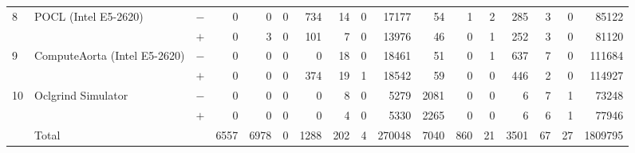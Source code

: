 \begin{tabular}{lll | rrrrrrr | rrrrrrr }
\hline
\multirow{ 2}{*}{8} & \multirow{ 2}{*}{POCL (Intel E5-2620)} & $-$ & 0 & 0 & 0 & 734 & 14 & 0 & 17177       & 54 & 1 & 2 & 285 & 3 & 0 & 85122 \\& & $+$ & 0 & 3 & 0 & 101 & 7 & 0 & 13976 & 46 & 0 & 1 & 252 & 3 & 0 & 81120 \\
\hline
\multirow{ 2}{*}{9} & \multirow{ 2}{*}{ComputeAorta (Intel E5-2620)} & $-$ & 0 & 0 & 0 & 0 & 18 & 0 & 18461       & 51 & 0 & 1 & 637 & 7 & 0 & 111684 \\& & $+$ & 0 & 0 & 0 & 374 & 19 & 1 & 18542 & 59 & 0 & 0 & 446 & 2 & 0 & 114927 \\
\hline
\multirow{ 2}{*}{10} & \multirow{ 2}{*}{Oclgrind Simulator} & $-$ & 0 & 0 & 0 & 0 & 8 & 0 & 5279       & 2081 & 0 & 0 & 6 & 7 & 1 & 73248 \\& & $+$ & 0 & 0 & 0 & 0 & 4 & 0 & 5330 & 2265 & 0 & 0 & 6 & 6 & 1 & 77946 \\
  \midrule

\multirow{ 2}{*}{} & \multirow{ 2}{*}{Total} & \multirow{ 2}{*}{} &
\multirow{ 2}{*}{6557} & \multirow{ 2}{*}{6978} & \multirow{ 2}{*}{0} & \multirow{ 2}{*}{1288} & \multirow{ 2}{*}{202} & \multirow{ 2}{*}{4} & \multirow{ 2}{*}{270048} & \multirow{ 2}{*}{7040} & \multirow{ 2}{*}{860} & \multirow{ 2}{*}{21} & \multirow{ 2}{*}{3501} & \multirow{ 2}{*}{67} & \multirow{ 2}{*}{27} & \multirow{ 2}{*}{1809795} \\
\\

  \bottomrule
\end{tabular}
